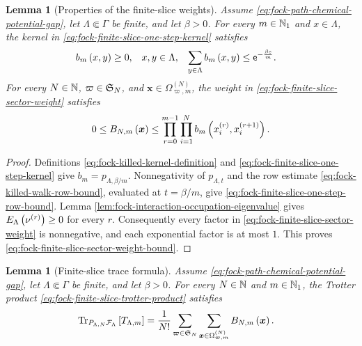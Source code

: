 \documentclass[11pt,a4paper]{article}
\theoremstyle{plain}
\newtheorem{lem}[thm]{Lemma}
\theoremstyle{definition}
\theoremstyle{remark}
\begin{document}
\begin{lem}[Properties of the finite-slice weights]\label{lem:fock-finite-slice-weight-properties}
Assume \eqref{eq:fock-path-chemical-potential-gap}, let $\Lambda\Subset\Gamma$ be finite, and let $\beta>0$.
For every $m\in\mathbb{N}_1$ and $x\in\Lambda$, the kernel in
\eqref{eq:fock-finite-slice-one-step-kernel} satisfies
\begin{equation}
\begin{aligned}
b_m \left( x,y \right)
& \geq0,
&& x,y\in\Lambda,
&
\sum_{y\in\Lambda}b_m \left( x,y \right)
& \leq
\mathsf{e}^{-\frac{\beta\varepsilon}{m}}.
\end{aligned}
\label{eq:fock-finite-slice-one-step-row-bound}
\end{equation}
For every $N\in\mathbb{N}$, $\varpi\in\grsym{N}$, and
$\boldsymbol{x}\in\Omega_{\varpi,m}^{(N)}$, the weight in
\eqref{eq:fock-finite-slice-sector-weight} satisfies
\begin{equation}
\begin{aligned}
0
\leq
B_{N,m} \left( \boldsymbol{x} \right)
\leq
\prod_{r=0}^{m-1}\prod_{i=1}^{N}
b_m \left( x_i^{(r)},x_i^{(r+1)} \right).
\end{aligned}
\label{eq:fock-finite-slice-sector-weight-bound}
\end{equation}
\end{lem}

\begin{proof}
Definitions \eqref{eq:fock-killed-kernel-definition} and
\eqref{eq:fock-finite-slice-one-step-kernel} give
$b_m=p_{\Lambda,\beta/m}$.  Nonnegativity of $p_{\Lambda,t}$ and the row estimate
\eqref{eq:fock-killed-walk-row-bound}, evaluated at $t=\beta/m$, give
\eqref{eq:fock-finite-slice-one-step-row-bound}.
Lemma \ref{lem:fock-interaction-occupation-eigenvalue} gives
$E_{\Lambda} \left( \nu^{(r)} \right)\geq0$ for every $r$.
Consequently every factor in \eqref{eq:fock-finite-slice-sector-weight} is nonnegative, and each exponential
factor is at most $1$.  This proves \eqref{eq:fock-finite-slice-sector-weight-bound}.
\end{proof}

\begin{lem}[Finite-slice trace formula]\label{lem:fock-finite-slice-trace-formula}
Assume \eqref{eq:fock-path-chemical-potential-gap}, let $\Lambda\Subset\Gamma$ be finite, and let $\beta>0$.
For every $N\in\mathbb{N}$ and $m\in\mathbb{N}_1$, the Trotter product
\eqref{eq:fock-finite-slice-trotter-product} satisfies
\begin{equation}
\begin{aligned}
\sqfun{\trace_{P_{\Lambda,N}\sphilb{F}_{\Lambda}}}{T_{\Lambda,m}}
& =
\frac{1}{N!}
\sum_{\varpi \in \grsym{N}}
\sum_{\boldsymbol{x} \in \Omega_{\varpi,m}^{(N)}}
\fun{B_{N,m}}{\boldsymbol{x}}.
\end{aligned}
\label{eq:fock-finite-slice-trace-formula}
\end{equation}
\end{lem}
\end{document}

